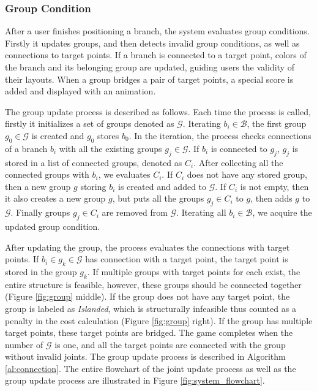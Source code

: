 


\subsubsection{Group Condition}

After a user finishes positioning a branch, the system evaluates group conditions.
Firstly it updates groups, and then detects invalid group conditions, as well as connections to target points.
If a branch is connected to a target point, colors of the branch and its belonging group are updated, guiding users the validity of their layouts.
When a group bridges a pair of target points, a special score is added and displayed with an animation.

The group update process is described as follows.
Each time the process is called, firstly it initializes a set of groups denoted as $\mathcal{G}$.
Iterating $b_i \in \mathcal{B}$, the first group $g_0 \in \mathcal{G}$ is created and $g_0$ stores $b_0$.
In the iteration, the process checks connections of a branch $b_i$ with all the existing groups $ g_j \in \mathcal{G}$.
If $b_i$ is connected to $g_j$, $g_j$ is stored in a list of connected groups, denoted as $C_i$.
After collecting all the connected groups with $b_i$, we evaluates $C_i$.
If $C_i$ does not have any stored group, then a new group $g$ storing $b_i$ is created and added to $\mathcal{G}$.
If $C_i$ is not empty, then it also creates a new group $g$, but puts all the groups $g_j \in C_i$ to $g$, then adds $g$ to $\mathcal{G}$.
Finally groups $g_j \in C_i$ are removed from $\mathcal{G}$.
Iterating all $b_i \in \mathcal{B}$, we acquire the updated group condition.

After updating the group, the process evaluates the connections with target points.
If $b_i \in g_k \in \mathcal{G}$ has connection with a target point, the target point is stored in the group $g_k$.
If multiple groups with target points for each exist, the entire structure is feasible, however, these groups should be connected together (Figure \ref{fig:group} middle).
If the group does not have any target point, the group is labeled as \textit{Islanded}, which is structurally infeasible thus counted as a penalty in the cost calculation (Figure \ref{fig:group} right).
If the group has multiple target points, these target points are bridged.
The game completes when the number of $\mathcal{G}$ is one, and all the target points are connected with the group without invalid joints.
The group update process is described in Algorithm \ref{al:connection}.
The entire flowchart of the joint update process as well as the group update process are illustrated in Figure \ref{fig:system_flowchart}.

